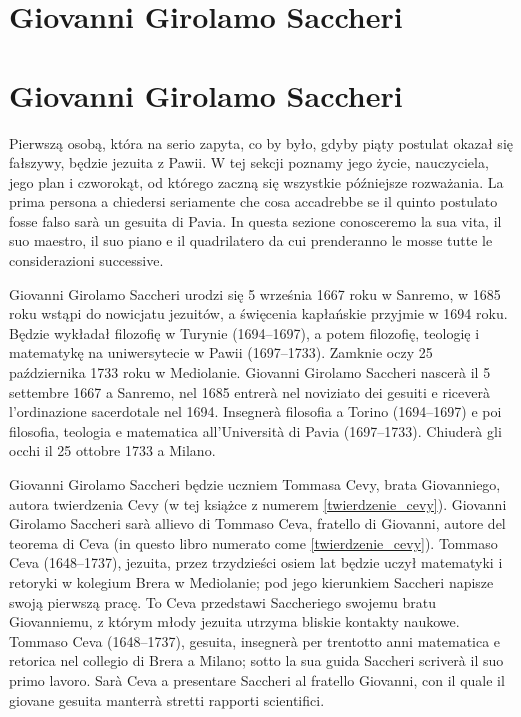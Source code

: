 
\section{Giovanni Girolamo Saccheri} %
\section{Giovanni Girolamo Saccheri} %
\label{sekcja_saccheri}

Pierwszą osobą, która na serio zapyta, co by było, gdyby piąty postulat okazał się fałszywy, będzie jezuita z Pawii. %
W tej sekcji poznamy jego życie, nauczyciela, jego plan i czworokąt, od którego zaczną się wszystkie późniejsze rozważania. %
La prima persona a chiedersi seriamente che cosa accadrebbe se il quinto postulato fosse falso sarà un gesuita di Pavia. %
In questa sezione conosceremo la sua vita, il suo maestro, il suo piano e il quadrilatero da cui prenderanno le mosse tutte le considerazioni successive. %

Giovanni Girolamo Saccheri urodzi się 5 września 1667 roku w Sanremo, w 1685 roku wstąpi do nowicjatu jezuitów, a święcenia kapłańskie przyjmie w 1694 roku. %
Będzie wykładał filozofię w Turynie (1694--1697), a potem filozofię, teologię i matematykę na uniwersytecie w Pawii (1697--1733). %
Zamknie oczy 25 października 1733 roku w Mediolanie. %
Giovanni Girolamo Saccheri nascerà il 5 settembre 1667 a Sanremo, nel 1685 entrerà nel noviziato dei gesuiti e riceverà l'ordinazione sacerdotale nel 1694. %
Insegnerà filosofia a Torino (1694--1697) e poi filosofia, teologia e matematica all'Università di Pavia (1697--1733). %
Chiuderà gli occhi il 25 ottobre 1733 a Milano. %
%

Giovanni Girolamo Saccheri będzie uczniem Tommasa Cevy, brata Giovanniego, autora twierdzenia Cevy (w tej książce z numerem \ref{twierdzenie_cevy}). %
Giovanni Girolamo Saccheri sarà allievo di Tommaso Ceva, fratello di Giovanni, autore del teorema di Ceva (in questo libro numerato come \ref{twierdzenie_cevy}). %
Tommaso Ceva (1648--1737), jezuita, przez trzydzieści osiem lat będzie uczył matematyki i retoryki w kolegium Brera w Mediolanie; pod jego kierunkiem Saccheri napisze swoją pierwszą pracę. %
To Ceva przedstawi Saccheriego swojemu bratu Giovanniemu, z którym młody jezuita utrzyma bliskie kontakty naukowe. %
Tommaso Ceva (1648--1737), gesuita, insegnerà per trentotto anni matematica e retorica nel collegio di Brera a Milano; sotto la sua guida Saccheri scriverà il suo primo lavoro. %
Sarà Ceva a presentare Saccheri al fratello Giovanni, con il quale il giovane gesuita manterrà stretti rapporti scientifici. %
%
%

